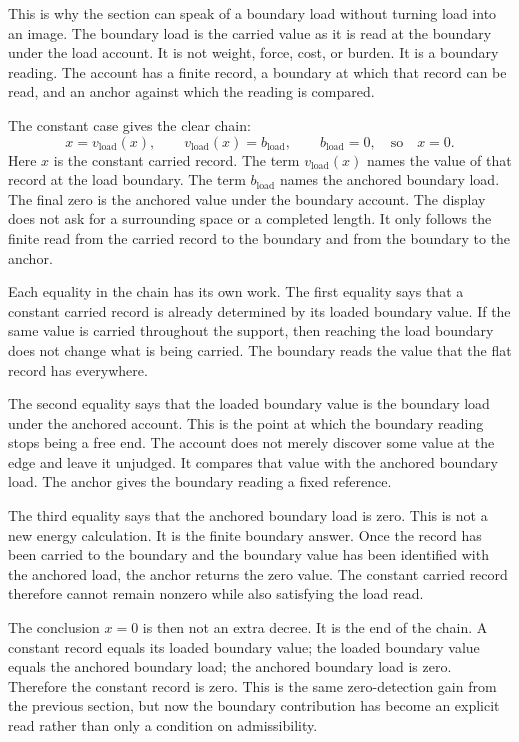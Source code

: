 This is why the section can speak of a boundary load without turning load into
an image. The boundary load is the carried value as it is read at the boundary
under the load account. It is not weight, force, cost, or burden. It is a
boundary reading. The account has a finite record, a boundary at which that
record can be read, and an anchor against which the reading is compared.

The constant case gives the clear chain:
\[
  x = v_{\mathrm{load}}(x),\qquad
  v_{\mathrm{load}}(x) = b_{\mathrm{load}},\qquad
  b_{\mathrm{load}} = 0,
  \quad\text{so}\quad x = 0 .
\]
Here \(x\) is the constant carried record. The term
\(v_{\mathrm{load}}(x)\) names the value of that record at the load boundary.
The term \(b_{\mathrm{load}}\) names the anchored boundary load. The final zero
is the anchored value under the boundary account. The display does not ask for
a surrounding space or a completed length. It only follows the finite read
from the carried record to the boundary and from the boundary to the anchor.

Each equality in the chain has its own work. The first equality says that a
constant carried record is already determined by its loaded boundary value. If
the same value is carried throughout the support, then reaching the load
boundary does not change what is being carried. The boundary reads the value
that the flat record has everywhere.

The second equality says that the loaded boundary value is the boundary load
under the anchored account. This is the point at which the boundary reading
stops being a free end. The account does not merely discover some value at the
edge and leave it unjudged. It compares that value with the anchored boundary
load. The anchor gives the boundary reading a fixed reference.

The third equality says that the anchored boundary load is zero. This is not a
new energy calculation. It is the finite boundary answer. Once the record has
been carried to the boundary and the boundary value has been identified with
the anchored load, the anchor returns the zero value. The constant carried
record therefore cannot remain nonzero while also satisfying the load read.

The conclusion \(x=0\) is then not an extra decree. It is the end of the
chain. A constant record equals its loaded boundary value; the loaded boundary
value equals the anchored boundary load; the anchored boundary load is zero.
Therefore the constant record is zero. This is the same zero-detection gain
from the previous section, but now the boundary contribution has become an
explicit read rather than only a condition on admissibility.

